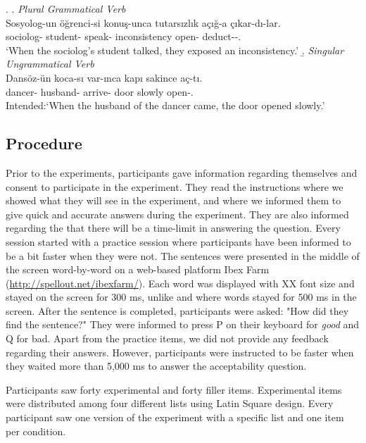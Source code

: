 \documentclass[doc,a4paper,man,natbib,floatsintext,noextraspace]{apa6}\usepackage[]{graphicx}\usepackage[]{color}
\begin{document}
\ex. \label{item:exp1FillerItems}
\a. \textit{Plural Grammatical Verb}\\ 
\gll Sosyolog-un öğrenci-si konuş-unca tutarsızlık açığ-a çıkar-dı-lar.\\ 
sociolog-\Gen{}  student-\Poss{} speak-\Nmlz{} inconsistency  open-\Dat{} deduct-\Pst{}-\Pl{}.\\
\glt `When the sociolog's student talked, they exposed an inconsistency.' 
\b. \textit{Singular Ungrammatical Verb}\\ 
\gll *Dansöz-ün koca-sı var-ınca kapı sakince aç-tı.\\ 
dancer-\Gen{}  husband-\Poss{} arrive-\Nmlz{} door slowly  open-\Pst{}.\\
\glt Intended:`When the husband of the dancer came, the door opened slowly.'

\subsection{Procedure} \label{sec:exp1:procedure}

Prior to the experiments, participants gave information regarding themselves and consent to participate in the experiment. They read the instructions where we showed what they will see in the experiment, and where we informed them to give quick and accurate answers during the experiment. They are also informed regarding the that there will be a time-limit in answering the question. Every session started with a practice session where participants have been informed to be a bit faster when they were not. The sentences were presented in the middle of the screen word-by-word on a web-based platform Ibex Farm (\url{http://spellout.net/ibexfarm/}). Each word was displayed with XX font size and stayed on the screen for 300 ms, unlike \citet{LagoEtAl:2018} and \citet{WagersEtAl:2009} where words stayed for 500 ms in the screen. After the sentence is completed, participants were asked: "How did they find the sentence?" They were informed to press P on their keyboard for \textit{good} and Q for bad. Apart from the practice items, we did not provide any feedback regarding their answers. However, participants were instructed to be faster when they waited more than 5,000 ms to answer the acceptability question. 

Participants saw forty experimental and forty filler items. Experimental items were distributed among four different lists using Latin Square design. Every participant saw one version of the experiment with a specific list and one item per condition.   
\end{document}
